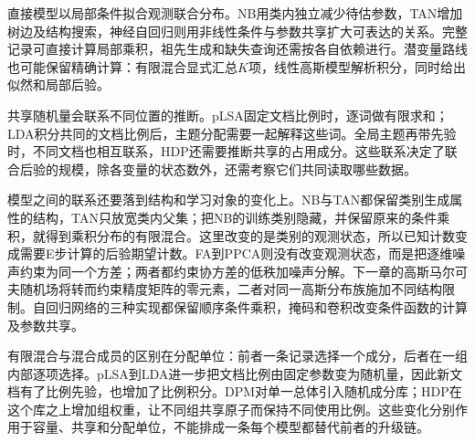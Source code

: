 直接模型以局部条件拟合观测联合分布。NB用类内独立减少待估参数，TAN增加树边及结构搜索，神经自回归则用非线性条件与参数共享扩大可表达的关系。完整记录可直接计算局部乘积，祖先生成和缺失查询还需按各自依赖进行。潜变量路线也可能保留精确计算：有限混合显式汇总$K$项，线性高斯模型解析积分，同时给出似然和局部后验。

共享随机量会联系不同位置的推断。pLSA固定文档比例时，逐词做有限求和；LDA积分共同的文档比例后，主题分配需要一起解释这些词。全局主题再带先验时，不同文档也相互联系，HDP还需要推断共享的占用成分。这些联系决定了联合后验的规模，除各变量的状态数外，还需考察它们共同读取哪些数据。

模型之间的联系还要落到结构和学习对象的变化上。NB与TAN都保留类别生成属性的结构，TAN只放宽类内父集；把NB的训练类别隐藏，并保留原来的条件乘积，就得到乘积分布的有限混合。这里改变的是类别的观测状态，所以已知计数变成需要E步计算的后验期望计数。FA到PPCA则没有改变观测状态，而是把逐维噪声约束为同一个方差；两者都约束协方差的低秩加噪声分解。下一章的高斯马尔可夫随机场将转而约束精度矩阵的零元素，二者对同一高斯分布族施加不同结构限制。自回归网络的三种实现都保留顺序条件乘积，掩码和卷积改变条件函数的计算及参数共享。

有限混合与混合成员的区别在分配单位：前者一条记录选择一个成分，后者在一组内部逐项选择。pLSA到LDA进一步把文档比例由固定参数变为随机量，因此新文档有了比例先验，也增加了比例积分。DPM对单一总体引入随机成分库；HDP在这个库之上增加组权重，让不同组共享原子而保持不同使用比例。这些变化分别作用于容量、共享和分配单位，不能排成一条每个模型都替代前者的升级链。

